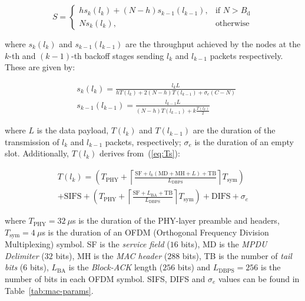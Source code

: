 	\begin{equation}
			S =
				\begin{cases}\label{eq:bound}
					hs_{k}(l_{k}) + (N-h)s_{k-1}(l_{k-1}), & \text{if } N > B_{\text{d}} \\
					Ns_{k}(l_{k}), & \text{otherwise}
				\end{cases}
	\end{equation}
	
	where $s_{k}(l_{k})$ and $s_{k-1}(l_{k-1})$ are the throughput achieved by the nodes at the $k$-th and $(k-1)$-th backoff stages sending $l_{k}$ and $l_{k-1}$ packets respectively. These are given by:
	
	\begin{subequations}
		\begin{align}
			&s_{k}(l_{k}) = \frac{l_{k} L}{hT(l_{k})+2(N-h)T(l_{k-1}) + \sigma_{e}(C - N)}\label{eq:HighNodes}\\
			&s_{k-1}(l_{k-1}) = \frac{l_{k-1} L}{(N-h)T(l_{k-1}) + k\frac{T(l_{k})}{2}}\label{eq:LowNodes}
		\end{align}
	\end{subequations}
	
	where $L$ is the data payload, $T(l_{k})$ and $T(l_{k-1})$ are the duration of the transmission of $l_{k}$ and $l_{k-1}$ packets, respectively; $\sigma_{e}$ is the duration of an empty slot. Additionally, $T(l_{k})$ derives from~(\ref{eq:Ts}):
	
	\begin{multline}\label{eq:Ts}
		T(l_{k})= \left( T_{\text{PHY}} + \left\lceil \frac{ \text{SF} + l_{k} (\text{MD}+\text{MH}+L) + \text{TB}}{L_{\text{DBPS}}}\right\rceil T_{\text{sym}} \right) \\ 
		+ \text{SIFS}+\left(T_{\text{PHY}} + \left\lceil\frac{\text{SF} + L_{\text{BA}} + \text{TB}}{L_{\text{DBPS}}} \right \rceil T_{\text{sym}} \right) + \text{DIFS} + \sigma_{e}
	\end{multline}
	
	where $T_{\text{PHY}}=32~\mu$s is the duration of the PHY-layer preamble and headers, $T_{\text{sym}}=4~\mu$s is the duration of an OFDM (Orthogonal Frequency Division Multiplexing) symbol. SF is the \emph{service field} ($16$ bits), $\text{MD}$ is the \textit{MPDU Delimiter} ($32$ bits), MH is the \emph{MAC header} ($288$ bits), TB is the number of \emph{tail bits} ($6$ bits), $L_{\text{BA}}$ is the \emph{Block-ACK} length ($256$ bits) and $L_{\text{DBPS}}=256$ is the number of bits in each OFDM symbol. SIFS, DIFS and $\sigma_{e}$ values can be found in Table~\ref{tab:mac-params}.

